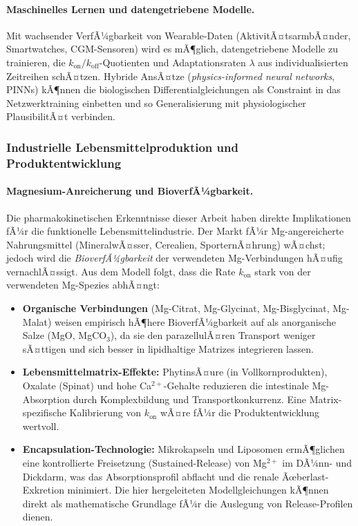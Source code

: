 ﻿\documentclass[12pt,a4paper]{article}
\theoremstyle{plain}
\theoremstyle{definition}
\theoremstyle{remark}
\begin{document}
\paragraph{Maschinelles Lernen und datengetriebene Modelle.}
Mit wachsender VerfÃ¼gbarkeit von Wearable-Daten (AktivitÃ¤tsarmbÃ¤nder,
Smartwatches, CGM-Sensoren) wird es mÃ¶glich, datengetriebene Modelle
zu trainieren, die $k_\text{on}/k_\text{off}$-Quotienten und
Adaptationsraten $\lambda$ aus individualisierten Zeitreihen schÃ¤tzen.
Hybride AnsÃ¤tze (\emph{physics-informed neural networks}, PINNs) kÃ¶nnen
die biologischen Differentialgleichungen als Constraint in das
Netzwerktraining einbetten und so Generalisierung mit physiologischer
PlausibilitÃ¤t verbinden.

\subsubsection{Industrielle Lebensmittelproduktion und Produktentwicklung}

\paragraph{Magnesium-Anreicherung und BioverfÃ¼gbarkeit.}
Die pharmakokinetischen Erkenntnisse dieser Arbeit haben direkte Implikationen
fÃ¼r die funktionelle Lebensmittelindustrie. Der Markt fÃ¼r
Mg-angereicherte Nahrungsmittel (MineralwÃ¤sser, Cerealien, SporternÃ¤hrung)
wÃ¤chst; jedoch wird die \emph{BioverfÃ¼gbarkeit} der verwendeten Mg-Verbindungen
hÃ¤ufig vernachlÃ¤ssigt. Aus dem Modell folgt, dass die Rate $k_\text{on}$
stark von der verwendeten Mg-Spezies abhÃ¤ngt:
\begin{itemize}
  \item \textbf{Organische Verbindungen} (Mg-Citrat, Mg-Glycinat,
        Mg-Bisglycinat, Mg-Malat) weisen empirisch hÃ¶here BioverfÃ¼gbarkeit
        auf als anorganische Salze (MgO, MgCO$_3$), da sie den
        parazellulÃ¤ren Transport weniger sÃ¤ttigen und sich besser in
        lipidhaltige Matrizes integrieren lassen.
  \item \textbf{Lebensmittelmatrix-Effekte:} PhytinsÃ¤ure (in Vollkornprodukten),
        Oxalate (Spinat) und hohe Ca$^{2+}$-Gehalte reduzieren die intestinale
        Mg-Absorption durch Komplexbildung und Transportkonkurrenz. Eine
        Matrix-spezifische Kalibrierung von $k_\text{on}$ wÃ¤re fÃ¼r die
        Produktentwicklung wertvoll.
  \item \textbf{Encapsulation-Technologie:} Mikrokapseln und Liposomen
        ermÃ¶glichen eine kontrollierte Freisetzung (Sustained-Release) von
        Mg$^{2+}$ im DÃ¼nn- und Dickdarm, was das Absorptionsprofil abflacht
        und die renale Ãœberlast-Exkretion minimiert. Die hier hergeleiteten
        Modellgleichungen kÃ¶nnen direkt als mathematische Grundlage fÃ¼r die
        Auslegung von Release-Profilen dienen.
\end{itemize}
\end{document}
